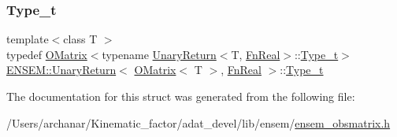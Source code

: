 \subsubsection{\texorpdfstring{Type\_t}{Type\_t}\hspace{0.1cm}{\footnotesize\ttfamily [2/2]}}
{\footnotesize\ttfamily template$<$class T $>$ \\
typedef \mbox{\hyperlink{classENSEM_1_1OMatrix}{O\+Matrix}}$<$typename \mbox{\hyperlink{structENSEM_1_1UnaryReturn}{Unary\+Return}}$<$T, \mbox{\hyperlink{structENSEM_1_1FnReal}{Fn\+Real}}$>$\+::\mbox{\hyperlink{structENSEM_1_1UnaryReturn_3_01OMatrix_3_01T_01_4_00_01FnReal_01_4_a060b381191f238b0c1dc9189a3a14c6d}{Type\+\_\+t}}$>$ \mbox{\hyperlink{structENSEM_1_1UnaryReturn}{E\+N\+S\+E\+M\+::\+Unary\+Return}}$<$ \mbox{\hyperlink{classENSEM_1_1OMatrix}{O\+Matrix}}$<$ T $>$, \mbox{\hyperlink{structENSEM_1_1FnReal}{Fn\+Real}} $>$\+::\mbox{\hyperlink{structENSEM_1_1UnaryReturn_3_01OMatrix_3_01T_01_4_00_01FnReal_01_4_a060b381191f238b0c1dc9189a3a14c6d}{Type\+\_\+t}}}



The documentation for this struct was generated from the following file\+:\begin{DoxyCompactItemize}
\item 
/\+Users/archanar/\+Kinematic\+\_\+factor/adat\+\_\+devel/lib/ensem/\mbox{\hyperlink{lib_2ensem_2ensem__obsmatrix_8h}{ensem\+\_\+obsmatrix.\+h}}\end{DoxyCompactItemize}
